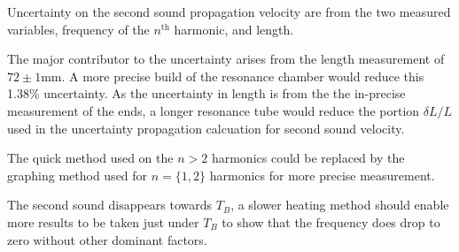 Uncertainty on the second sound propagation velocity are from the
two measured variables, frequency of the $n^\text{th}$ harmonic, and length.

The major contributor to the uncertainty 
arises from the length measurement of $72\pm1$mm. 
A more precise build of the resonance chamber would reduce this 1.38\% uncertainty.
As the uncertainty in length is from the the in-precise measurement of the ends,
a longer resonance tube would reduce the portion $\delta L / L$ used in the
uncertainty propagation calcuation for second sound velocity.

The quick method used on the $n>2$ harmonics could be 
replaced by the  graphing
method used for $n=\{1,2\}$ harmonics for more precise measurement.

The second sound disappears towards $T_B$, a slower heating method
should enable more results to be taken just under $T_B$ to show that the
frequency does drop to zero without other dominant factors.

